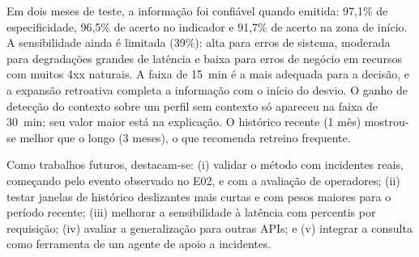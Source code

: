 \documentclass[sigconf,nonacm]{acmart}
\begin{document}
Em dois meses de teste, a informação foi confiável quando emitida: 97,1\% de especificidade, 96,5\% de acerto no indicador e 91,7\% de acerto na zona de início. A sensibilidade ainda é limitada (39\%): alta para erros de sistema, moderada para degradações grandes de latência e baixa para erros de negócio em recursos com muitos 4xx naturais. A faixa de 15~min é a mais adequada para a decisão, e a expansão retroativa completa a informação com o início do desvio. O ganho de detecção do contexto sobre um perfil sem contexto só apareceu na faixa de 30~min; seu valor maior está na explicação. O histórico recente (1 mês) mostrou-se melhor que o longo (3 meses), o que recomenda retreino frequente.

Como trabalhos futuros, destacam-se: (i) validar o método com incidentes reais, começando pelo evento observado no E02, e com a avaliação de operadores; (ii) testar janelas de histórico deslizantes mais curtas e com pesos maiores para o período recente; (iii) melhorar a sensibilidade à latência com percentis por requisição; (iv) avaliar a generalização para outras APIs; e (v) integrar a consulta como ferramenta de um agente de apoio a incidentes.



\end{document}
